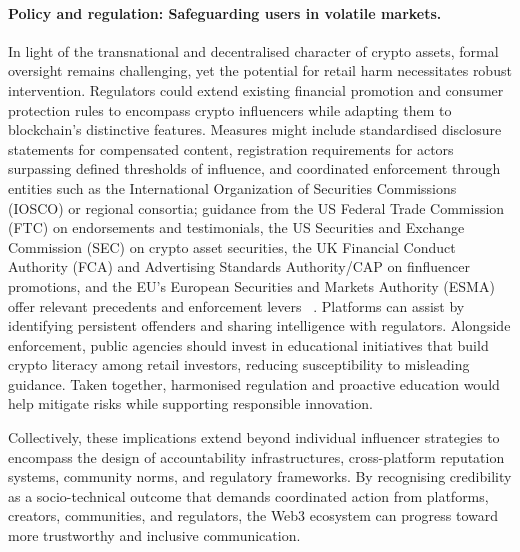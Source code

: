 \paragraph{Policy and regulation: Safeguarding users in volatile markets.}
In light of the transnational and decentralised character of crypto assets, formal oversight remains challenging, yet the potential for retail harm necessitates robust intervention. Regulators could extend existing financial promotion and consumer protection rules to encompass crypto influencers while adapting them to blockchain’s distinctive features. Measures might include standardised disclosure statements for compensated content, registration requirements for actors surpassing defined thresholds of influence, and coordinated enforcement through entities such as the International Organization of Securities Commissions (IOSCO) or regional consortia; guidance from the US Federal Trade Commission (FTC) on endorsements and testimonials, the US Securities and Exchange Commission (SEC) on crypto asset securities, the UK Financial Conduct Authority (FCA) and Advertising Standards Authority/CAP on finfluencer promotions, and the EU’s European Securities and Markets Authority (ESMA) offer relevant precedents and enforcement levers ~\cite{FTC2023EndorsementGuides, SECInvestorCrypto, FCA2023Finfluencer, ASAInfluencer2023, IOSCO2023Crypto, ESMA2023MiCAR}. Platforms can assist by identifying persistent offenders and sharing intelligence with regulators. Alongside enforcement, public agencies should invest in educational initiatives that build crypto literacy among retail investors, reducing susceptibility to misleading guidance. Taken together, harmonised regulation and proactive education would help mitigate risks while supporting responsible innovation.

Collectively, these implications extend beyond individual influencer strategies to encompass the design of accountability infrastructures, cross-platform reputation systems, community norms, and regulatory frameworks. By recognising credibility as a socio-technical outcome that demands coordinated action from platforms, creators, communities, and regulators, the Web3 ecosystem can progress toward more trustworthy and inclusive communication.


